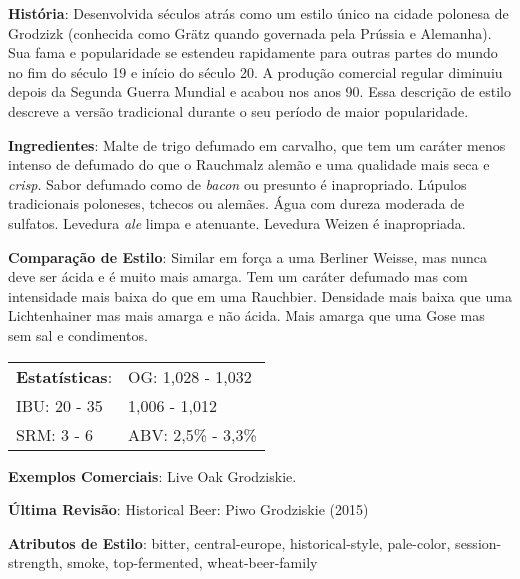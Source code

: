 \textbf{História}: Desenvolvida séculos atrás como um estilo único na cidade polonesa de Grodzizk (conhecida como Grätz quando governada pela Prússia e Alemanha). Sua fama e popularidade se estendeu rapidamente para outras partes do mundo no fim do século 19 e início do século 20. A produção comercial regular diminuiu depois da Segunda Guerra Mundial e acabou nos anos 90. Essa descrição de estilo descreve a versão tradicional durante o seu período de maior popularidade.

\textbf{Ingredientes}: Malte de trigo defumado em carvalho, que tem um caráter menos intenso de defumado do que o Rauchmalz alemão e uma qualidade mais seca e \textit{crisp}. Sabor defumado como de \textit{bacon} ou presunto é inapropriado. Lúpulos tradicionais poloneses, tchecos ou alemães. Água com dureza moderada de sulfatos. Levedura \textit{ale} limpa e atenuante. Levedura Weizen é inapropriada.

\textbf{Comparação de Estilo}: Similar em força a uma Berliner Weisse, mas nunca deve ser ácida e é muito mais amarga. Tem um caráter defumado mas com intensidade mais baixa do que em uma Rauchbier. Densidade mais baixa que uma Lichtenhainer mas mais amarga e não ácida. Mais amarga que uma Gose mas sem sal e condimentos.

\begin{tabular}{@{}p{35mm}p{35mm}@{}}
  \textbf{Estatísticas}: & OG: 1,028 - 1,032 \\
  IBU: 20 - 35  & 1,006 - 1,012  \\
  SRM: 3 - 6 & ABV: 2,5\% - 3,3\%
\end{tabular}

\textbf{Exemplos Comerciais}: Live Oak Grodziskie.

\textbf{Última Revisão}: Historical Beer: Piwo Grodziskie (2015)

\textbf{Atributos de Estilo}: bitter, central-europe, historical-style, pale-color, session-strength, smoke, top-fermented, wheat-beer-family
